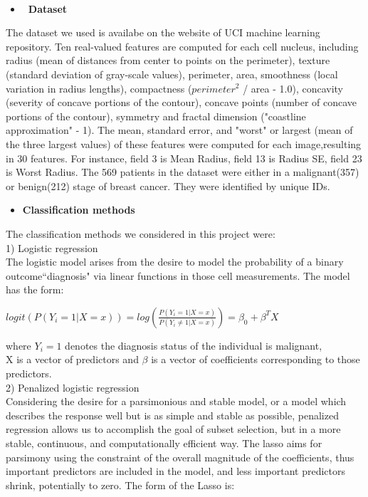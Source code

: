 \documentclass[11pt]{article}
\begin{document}
 \vspace{2ex}\\
\begin{itemize}
\item {\bf\ Dataset }
\end{itemize}
The dataset we used is availabe on the website of UCI machine learning repository. Ten real-valued features are computed for each cell nucleus, including radius (mean of distances from center to points on the perimeter), texture (standard deviation of gray-scale values), perimeter, area, smoothness (local variation in radius lengths), compactness ($perimeter^2$ / area - 1.0), concavity (severity of concave portions of the contour), concave points (number of concave portions of the contour), symmetry and fractal dimension ("coastline approximation" - 1). The mean, standard error, and "worst" or largest (mean of the three
largest values) of these features were computed for each image,resulting in 30 features.  For instance, field 3 is Mean Radius, field 13 is Radius SE, field 23 is Worst Radius. The 569 patients in the dataset were either in a malignant(357) or benign(212) stage of breast cancer. They were identified by unique IDs. 
\begin{itemize}
\item {\bf Classification methods }
\end{itemize}
The classification methods we considered in this project were:\\
1) Logistic regression\\
The logistic model arises from the desire to model the probability of a binary outcome``diagnosis" via linear functions in those cell measurements. The model has the form:
\begin{center}
$logit(P(Y_i=1|X=x))=log(\frac{P(Y_i=1|X=x)}{P(Y_i\neq{1}|X=x)})=\beta_0+\beta^TX$\vspace{1.5ex}\\
\end{center}
where $Y_i=1$ denotes the diagnosis status of the individual is malignant,\\
X is a vector of predictors and $\beta$ is a vector of coefficients corresponding to those predictors.\vspace{2ex}\\
2) Penalized logistic regression\\
Considering the desire for a parsimonious and stable model, or a model which describes the response well but is as simple and stable as possible,  penalized regression allows us to accomplish the goal of subset selection, but in a more stable, continuous, and computationally efficient way. The lasso aims for parsimony using the constraint of the overall magnitude of the coefficients, thus important predictors are included in the model, and less important predictors shrink, potentially to zero. The form of the Lasso is:
\end{document}
